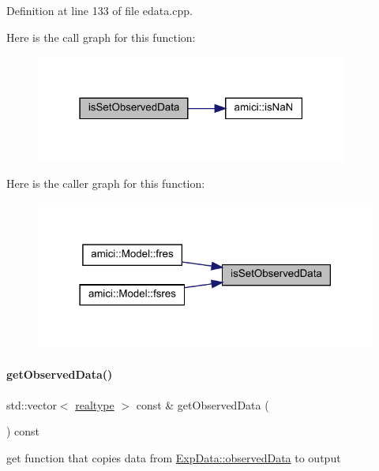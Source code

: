 Definition at line 133 of file edata.\+cpp.

Here is the call graph for this function\+:
\nopagebreak
\begin{figure}[H]
\begin{center}
\leavevmode
\includegraphics[width=291pt]{classamici_1_1_exp_data_aedcda756b6356d6e147f2f4eb7658500_cgraph}
\end{center}
\end{figure}
Here is the caller graph for this function\+:
\nopagebreak
\begin{figure}[H]
\begin{center}
\leavevmode
\includegraphics[width=318pt]{classamici_1_1_exp_data_aedcda756b6356d6e147f2f4eb7658500_icgraph}
\end{center}
\end{figure}
\mbox{\label{classamici_1_1_exp_data_a509b3b8f38e8529dd59c1415dc6b839c}} 
\paragraph{\texorpdfstring{getObservedData()}{getObservedData()}}
{\footnotesize\ttfamily std\+::vector$<$ \mbox{\hyperlink{namespaceamici_a1bdce28051d6a53868f7ccbf5f2c14a3}{realtype}} $>$ const  \& get\+Observed\+Data (\begin{DoxyParamCaption}{ }\end{DoxyParamCaption}) const}

get function that copies data from \mbox{\hyperlink{classamici_1_1_exp_data_a6acedf749a3c5e4c4dcbc822f58a565d}{Exp\+Data\+::observed\+Data}} to output

